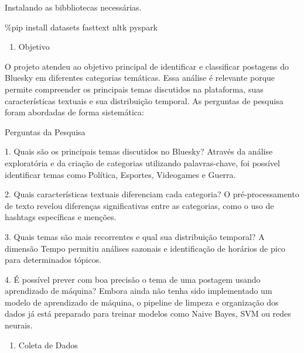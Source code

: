 \documentclass[
  letterpaper,
  DIV=11,
  numbers=noendperiod]{scrartcl}
\author{}
\date{}
\newenvironment{Shaded}{\begin{snugshade}}{\end{snugshade}}
\newcommand{\NormalTok}[1]{\textcolor[rgb]{0.00,0.23,0.31}{#1}}
\newcommand{\OperatorTok}[1]{\textcolor[rgb]{0.37,0.37,0.37}{#1}}
\providecommand{\tightlist}{%
  \setlength{\itemsep}{0pt}\setlength{\parskip}{0pt}}\usepackage{longtable,booktabs,array}
\begin{document}
Instalando as bibbliotecas necessárias.

\begin{Shaded}
\begin{Highlighting}[]
\OperatorTok{\%}\NormalTok{pip install datasets fasttext nltk pyspark}
\end{Highlighting}
\end{Shaded}

\begin{enumerate}
\def\labelenumi{\arabic{enumi}.}
\tightlist
\item
  Objetivo
\end{enumerate}

O projeto atendeu ao objetivo principal de identificar e classificar
postagens do Bluesky em diferentes categorias temáticas. Essa análise é
relevante porque permite compreender os principais temas discutidos na
plataforma, suas características textuais e sua distribuição temporal.
As perguntas de pesquisa foram abordadas de forma sistemática:

Perguntas da Pesquisa

\begin{VerbatimWithBreaks}
1. Quais são os principais temas discutidos no Bluesky?
    Através da análise exploratória e da criação de categorias utilizando palavras-chave, foi possível identificar temas como Política, Esportes, Videogames e Guerra.

2. Quais características textuais diferenciam cada categoria?
     O pré-processamento de texto revelou diferenças significativas entre as categorias, como o uso de hashtags específicas e menções.

3. Quais temas são mais recorrentes e qual sua distribuição temporal?
    A dimensão Tempo permitiu análises sazonais e identificação de horários de pico para determinados tópicos.

4. É possível prever com boa precisão o tema de uma postagem usando aprendizado de máquina?
    Embora ainda não tenha sido implementado um modelo de aprendizado de máquina, o pipeline de limpeza e organização dos dados já está preparado para treinar modelos como Naive Bayes, SVM ou redes neurais.
\end{VerbatimWithBreaks}

\begin{enumerate}
\def\labelenumi{\arabic{enumi}.}
\setcounter{enumi}{1}
\tightlist
\item
  Coleta de Dados
\end{enumerate}
\end{document}
